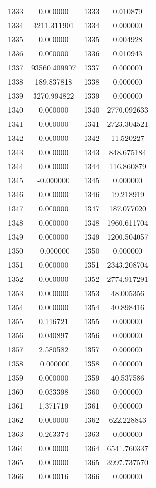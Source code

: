 \documentclass[12pt]{article}
\begin{document}
\begin{longtable}{@{}cccc@{}}
1333 & 0.000000 & 1333 & 0.010879 \\
1334 & 3211.311901 & 1334 & 0.000000 \\
1335 & 0.000000 & 1335 & 0.004928 \\
1336 & 0.000000 & 1336 & 0.010943 \\
1337 & 93560.409907 & 1337 & 0.000000 \\
1338 & 189.837818 & 1338 & 0.000000 \\
1339 & 3270.994822 & 1339 & 0.000000 \\
1340 & 0.000000 & 1340 & 2770.092633 \\
1341 & 0.000000 & 1341 & 2723.304521 \\
1342 & 0.000000 & 1342 & 11.520227 \\
1343 & 0.000000 & 1343 & 848.675184 \\
1344 & 0.000000 & 1344 & 116.860879 \\
1345 & -0.000000 & 1345 & 0.000000 \\
1346 & 0.000000 & 1346 & 19.218919 \\
1347 & 0.000000 & 1347 & 187.077020 \\
1348 & 0.000000 & 1348 & 1960.611704 \\
1349 & 0.000000 & 1349 & 1200.504057 \\
1350 & -0.000000 & 1350 & 0.000000 \\
1351 & 0.000000 & 1351 & 2343.208704 \\
1352 & 0.000000 & 1352 & 2774.917291 \\
1353 & 0.000000 & 1353 & 48.005356 \\
1354 & 0.000000 & 1354 & 40.898416 \\
1355 & 0.116721 & 1355 & 0.000000 \\
1356 & 0.040897 & 1356 & 0.000000 \\
1357 & 2.580582 & 1357 & 0.000000 \\
1358 & -0.000000 & 1358 & 0.000000 \\
1359 & 0.000000 & 1359 & 40.537586 \\
1360 & 0.033398 & 1360 & 0.000000 \\
1361 & 1.371719 & 1361 & 0.000000 \\
1362 & 0.000000 & 1362 & 622.228843 \\
1363 & 0.263374 & 1363 & 0.000000 \\
1364 & 0.000000 & 1364 & 6541.760337 \\
1365 & 0.000000 & 1365 & 3997.737570 \\
1366 & 0.000016 & 1366 & 0.000000 \\

\end{longtable}
\end{document}
